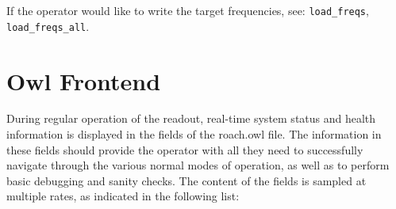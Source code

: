 \begin{itemize}[leftmargin=*,label={}]
If the operator would like to write the target frequencies, see: \texttt{load\_freqs}, \texttt{load\_freqs\_all}.
\end{itemize}

\section{Owl Frontend}
During regular operation of the readout, real-time system status and health information is displayed in the fields of the roach.owl file. The information in these fields should provide the operator with all they need to successfully navigate through the various normal modes of operation, as well as to perform basic debugging and sanity checks. The content of the fields is sampled at multiple rates, as indicated in the following list:

